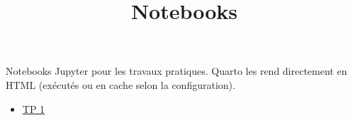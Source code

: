 \documentclass[
  french,
  12pt,
]{article}
\title{Notebooks}
\author{}
\date{}
\providecommand{\tightlist}{%
  \setlength{\itemsep}{0pt}\setlength{\parskip}{0pt}}
\begin{document}
\maketitle


Notebooks Jupyter pour les travaux pratiques. Quarto les rend
directement en HTML (exécutés ou en cache selon la configuration).

\begin{itemize}
\tightlist
\item
  \href{tp1.ipynb}{TP 1}
\end{itemize}
\end{document}
